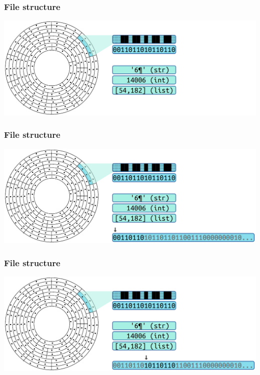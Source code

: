 \documentclass[11pt]{beamer}
\begin{document}
\begin{frame}[fragile]
  \frametitle{File structure}

  \includegraphics[width=\textwidth]{./img/file-structure-03.png}
\end{frame}

\begin{frame}[fragile]
  \frametitle{File structure}

  \includegraphics[width=\textwidth]{./img/file-structure-04a.png}
\end{frame}

\begin{frame}[fragile]
  \frametitle{File structure}

  \includegraphics[width=\textwidth]{./img/file-structure-04b.png}
\end{frame}
\end{document}
